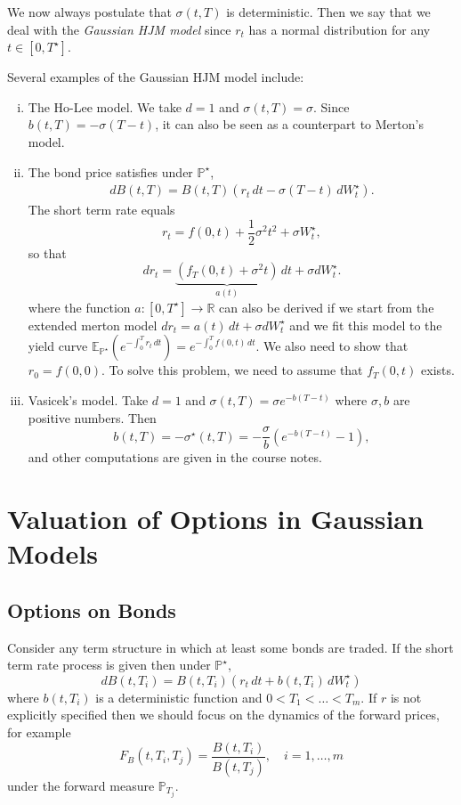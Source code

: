 \documentclass[10pt, oneside, reqno]{amsbook}
\theoremstyle{plain}%
\theoremstyle{definition}
\theoremstyle{remark}
\newcommand{\R}{\mathbb{R}}
\newcommand{\E}{\mathbb{E}}
\renewcommand{\P}{\mathbb{P}}
\numberwithin{equation}{chapter}
\begin{document}
We now always postulate that $\sigma(t, T)$ is deterministic.  Then we say that we deal with the \emph{Gaussian HJM model} since $r_t$ has a normal distribution for any $t \in [0, T^\star]$.  

Several examples of the Gaussian HJM model include: 
\begin{enumerate}[(i)]
    \item The Ho-Lee model.  We take $d = 1$ and $\sigma(t, T) = \sigma$.  Since $b(t, T) = - \sigma(T-t)$, it can also be seen as a counterpart to Merton's model.
    \item The bond price satisfies under $\P^\star$, \begin{align*}
        dB(t, T) = B(t, T) \left( r_t \, dt - \sigma(T- t) \, dW^\star_t \right).
    \end{align*}  The short term rate equals\[
        r_t = f(0, t) + \frac{1}{2} \sigma^2 t^2 + \sigma W^\star_t,
    \] so that \[
        dr_t = \underbrace{\left( f_T(0, t) + \sigma^2 t \right)}_{a(t)} \, dt + \sigma dW^\star_t .
    \] where the function $a : [0, T^\star] \rightarrow \R$ can also be derived if we start from the extended merton model $dr_t = a(t) \, dt + \sigma dW^\star_t$ and we fit this model to the yield curve $\E_{\P^\star} \left( e^{-\int_0^T r_t \, dt} \right) = e^{-\int_0^T f(0, t) \, dt}$.  We also need to show that $r_0 = f(0, 0)$.  To solve this problem, we need to assume that $f_T(0, t)$ exists.
    \item Vasicek's model.  Take $d = 1$ and $\sigma(t, T) = \sigma e^{-b(T-t)}$ where $\sigma, b$ are positive numbers.  Then \[
        b(t, T) = -\sigma^\star(t, T) = - \frac{\sigma}{b} \left(e^{-b(T- t)} - 1\right),
    \]  and other computations are given in the course notes.
\end{enumerate}




\chapter{Valuation of Options in Gaussian Models} %
\label{sec:valuation_of_options_in_gaussian_models}
\section{Options on Bonds} %
\label{sec:options_on_bonds}

Consider any term structure in which at least some bonds are traded.  If the short term rate process is given then under $\P^\star$, \[
    dB(t, T_i) = B(t, T_i) \left( r_t \, dt + b(t, T_i) \, dW^\star_t \right)
\] where $b(t, T_i)$ is a deterministic function and $0 < T_1 < \dots < T_m$.  If $r$ is not explicitly specified then we should focus on the dynamics of the forward prices, for example \[
    F_B(t, T_i, T_j) = \frac{B(t, T_i)}{B(t, T_j)}, \quad i = 1, \dots, m
\] under the forward measure $\P_{T_j}$.
\end{document}

